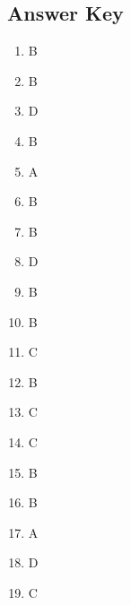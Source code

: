 \documentclass[12pt]{article}
\begin{document}
\subsection*{Answer Key}
\begin{enumerate}
    \item B
    \item B
    \item D
    \item B
    \item A
    \item B
    \item B
    \item D
    \item B
    \item B
    \item C
    \item B
    \item C
    \item C
    \item B
    \item B
    \item A
    \item D
    \item C
\end{enumerate}
\end{document}
